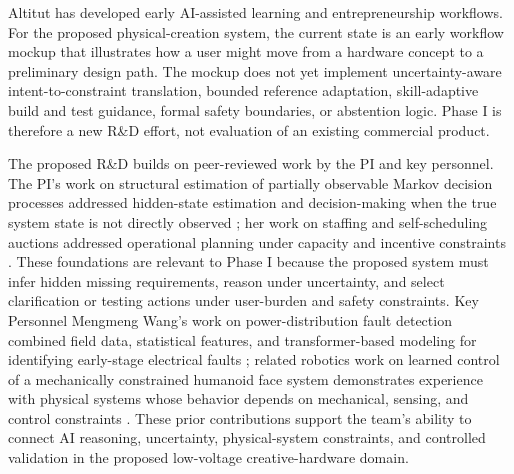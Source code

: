 

Altitut has developed early AI-assisted learning and entrepreneurship workflows. For the proposed physical-creation system, the current state is an early workflow mockup that illustrates how a user might move from a hardware concept to a preliminary design path. The mockup does not yet implement uncertainty-aware intent-to-constraint translation, bounded reference adaptation, skill-adaptive build and test guidance, formal safety boundaries, or abstention logic. Phase I is therefore a new R\&D effort, not evaluation of an existing commercial product.

The proposed R\&D builds on peer-reviewed work by the PI and key personnel. The PI's work on structural estimation of partially observable Markov decision processes addressed hidden-state estimation and decision-making when the true system state is not directly observed \cite{chang2023pomdp}; her work on staffing and self-scheduling auctions addressed operational planning under capacity and incentive constraints \cite{chang2021uniform}. These foundations are relevant to Phase I because the proposed system must infer hidden missing requirements, reason under uncertainty, and select clarification or testing actions under user-burden and safety constraints. Key Personnel Mengmeng Wang's work on power-distribution fault detection combined field data, statistical features, and transformer-based modeling for identifying early-stage electrical faults \cite{chen2022incipient}; related robotics work on learned control of a mechanically constrained humanoid face system demonstrates experience with physical systems whose behavior depends on mechanical, sensing, and control constraints \cite{hu2026lipmotions}. These prior contributions support the team's ability to connect AI reasoning, uncertainty, physical-system constraints, and controlled validation in the proposed low-voltage creative-hardware domain.

